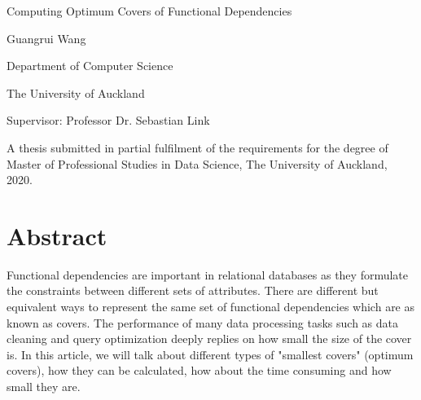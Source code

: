 \documentclass[11pt]{book}
\begin{document}
\pagestyle{empty}


\begin{center}

\vspace{1cm}

{\Huge Computing Optimum Covers of Functional Dependencies}

\vspace{75mm} 

{\Large Guangrui Wang}

\vspace{1ex}

Department of Computer Science

The University of Auckland

\vspace{5ex}

Supervisor: Professor Dr. Sebastian Link

\vspace*{60mm}

A thesis submitted in partial fulfilment of the requirements for the degree of Master of Professional Studies in Data Science, The University of Auckland, 2020.

\end{center}




\chapter*{Abstract}       
\setcounter{page}{1}
\pagestyle{headings}


Functional dependencies are important in relational databases as they formulate the constraints between different sets of attributes. There are different but equivalent ways to represent the same set of functional dependencies which are as known as covers. The performance of many data processing tasks such as data cleaning and query optimization deeply replies on how small the size of the cover is. In this article, we will talk about different types of "smallest covers" (optimum covers), how they can be calculated, how about the time consuming and how small they are.
\end{document}
